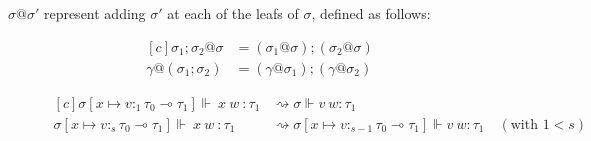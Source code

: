 $\sigma @ \sigma'$ represent adding $\sigma'$ at each of the leafs of $\sigma$,
defined as follows:
\begin{definition}
  \begin{equation}
    \begin{aligned}[c]
      \sigma_1; \sigma_2 @ \sigma &= (\sigma_1 @ \sigma);(\sigma_2 @ \sigma) \\
      \gamma @ (\sigma_1; \sigma_2) &= (\gamma @ \sigma_1);(\gamma @ \sigma_2)
    \end{aligned}
  \end{equation}
\end{definition}


\begin{figure}
\begin{center}
\tiny
\begin{equation*}
  \begin{aligned}[c]
    \sigma[x \mapsto v :_1 \tau_0 \multimap \tau_1] \Vdash \ x \ w \ : \tau_1 &\rightsquigarrow
    \sigma \Vdash v \ w : \tau_1 \\
    \sigma[x \mapsto v :_{s} \tau_0 \multimap \tau_1] \Vdash \ x \ w \ : \tau_1
    &\rightsquigarrow \sigma[x \mapsto v :_{s-1} \tau_0 \multimap \tau_1] \Vdash
    v \ w : \tau_1 \quad{(\text{with } 1 < s)} \\

\end{aligned}
\end{equation*}
\end{center}
\end{figure}

